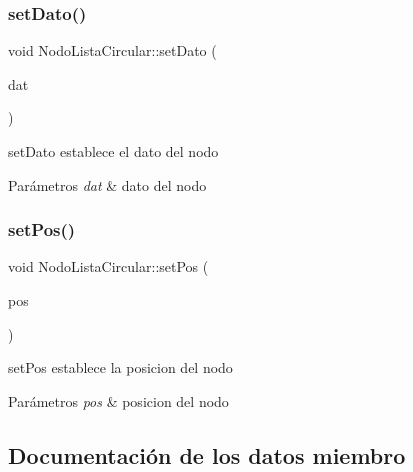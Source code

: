 \subsubsection{\texorpdfstring{set\+Dato()}{setDato()}}
{\footnotesize\ttfamily void Nodo\+Lista\+Circular\+::set\+Dato (\begin{DoxyParamCaption}\item[{Q\+String}]{dat }\end{DoxyParamCaption})\hspace{0.3cm}{\ttfamily [inline]}}



set\+Dato establece el dato del nodo 


\begin{DoxyParams}{Parámetros}
{\em dat} & dato del nodo \\
\hline
\end{DoxyParams}
\mbox{\label{class_nodo_lista_circular_aa6307fda1bf33f2d8035893ee9fea81a}} 
\subsubsection{\texorpdfstring{set\+Pos()}{setPos()}}
{\footnotesize\ttfamily void Nodo\+Lista\+Circular\+::set\+Pos (\begin{DoxyParamCaption}\item[{int}]{pos }\end{DoxyParamCaption})\hspace{0.3cm}{\ttfamily [inline]}}



set\+Pos establece la posicion del nodo 


\begin{DoxyParams}{Parámetros}
{\em pos} & posicion del nodo \\
\hline
\end{DoxyParams}


\subsection{Documentación de los datos miembro}
\mbox{\label{class_nodo_lista_circular_a62c97352f8df5d9b817568467d90ee33}} 
